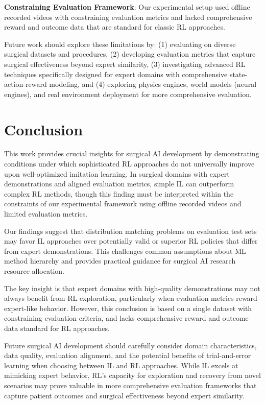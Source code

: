 \documentclass[runningheads]{llncs}
\begin{document}
\textbf{Constraining Evaluation Framework}: Our experimental setup used offline recorded videos with constraining evaluation metrics and lacked comprehensive reward and outcome data that are standard for classic RL approaches.

Future work should explore these limitations by: (1) evaluating on diverse surgical datasets and procedures, (2) developing evaluation metrics that capture surgical effectiveness beyond expert similarity, (3) investigating advanced RL techniques specifically designed for expert domains with comprehensive state-action-reward modeling, and (4) exploring physics engines, world models (neural engines), and real environment deployment for more comprehensive evaluation.


\section{Conclusion}

This work provides crucial insights for surgical AI development by demonstrating conditions under which sophisticated RL approaches do not universally improve upon well-optimized imitation learning. In surgical domains with expert demonstrations and aligned evaluation metrics, simple IL can outperform complex RL methods, though this finding must be interpreted within the constraints of our experimental framework using offline recorded videos and limited evaluation metrics.

Our findings suggest that distribution matching problems on evaluation test sets may favor IL approaches over potentially valid or superior RL policies that differ from expert demonstrations. This challenges common assumptions about ML method hierarchy and provides practical guidance for surgical AI research resource allocation.

The key insight is that expert domains with high-quality demonstrations may not always benefit from RL exploration, particularly when evaluation metrics reward expert-like behavior. However, this conclusion is based on a single dataset with constraining evaluation criteria, and lacks comprehensive reward and outcome data standard for RL approaches.

Future surgical AI development should carefully consider domain characteristics, data quality, evaluation alignment, and the potential benefits of trial-and-error learning when choosing between IL and RL approaches. While IL excels at mimicking expert behavior, RL's capacity for exploration and recovery from novel scenarios may prove valuable in more comprehensive evaluation frameworks that capture patient outcomes and surgical effectiveness beyond expert similarity.
\end{document}
